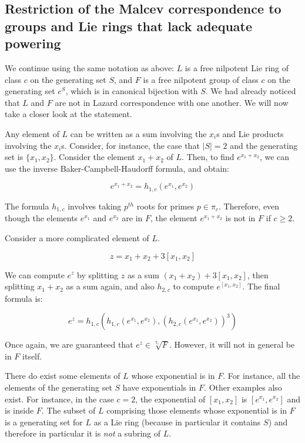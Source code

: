 \documentclass{ucetd}
\begin{document}
\subsection{Restriction of the Malcev correspondence to groups and Lie rings that lack adequate powering}

We continue using the same notation as above: $L$ is a free nilpotent
Lie ring of class $c$ on the generating set $S$, and $F$ is a free
nilpotent group of class $c$ on the generating set $e^S$, which is in
canonical bijection with $S$. We had already noticed that $L$ and $F$
are not in Lazard correspondence with one another. We will now take a
closer look at the statement.

Any element of $L$ can be written as a sum involving the $x_i$s and
Lie products involving the $x_i$s. Consider, for instance, the case
that $|S| = 2$ and the generating set is $\{ x_1, x_2 \}$. Consider
the element $x_1 + x_2$ of $L$. Then, to find $e^{x_1 + x_2}$, we can
use the inverse Baker-Campbell-Haudorff formula, and obtain:

$$e^{x_1 + x_2} = h_{1,c}(e^{x_1},e^{x_2})$$

The formula $h_{1,c}$ involves taking $p^{th}$ roots for primes $p \in
\pi_c$. Therefore, even though the elements $e^{x_1}$ and $e^{x_2}$ are in
$F$, the element $e^{x_1 + x_2}$ is not in $F$ if $c \ge 2$.

Consider a more complicated element of $L$.

$$z = x_1 + x_2 + 3[x_1,x_2]$$

We can compute $e^z$ by splitting $z$ as a sum $(x_1 + x_2) +
3[x_1,x_2]$, then splitting $x_1 + x_2$ as a sum again, and also
$h_{2,c}$ to compute $e^{[x_1,x_2]}$. The final formula is:

$$e^z = h_{1,c}(h_{1,c}(e^{x_1},e^{x_2}),(h_{2,c}(e^{x_1},e^{x_2}))^3)$$

Once again, we are guaranteed that $e^z \in \sqrt[\pi_c]{F}$. However,
it will not in general be in $F$ itself.

There do exist some elements of $L$ whose exponential is in $F$. For
instance, all the elements of the generating set $S$ have exponentials
in $F$. Other examples also exist. For instance, in the case $c = 2$,
the exponential of $[x_1,x_2]$ is $[e^{x_1},e^{x_2}]$ and is inside
$F$. The subset of $L$ comprising those elements whose exponential is
in $F$ is a generating set for $L$ as a Lie ring (because in
particular it contains $S$) and therefore in particular it is {\em
  not} a subring of $L$.
\end{document}
